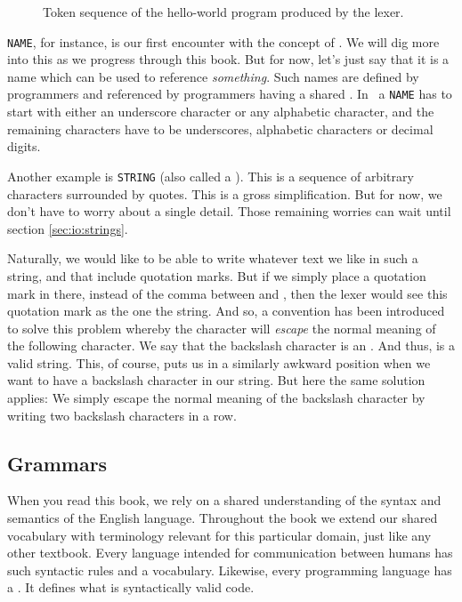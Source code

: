 \begin{figure}[tbp]
  
  \caption{Token sequence of the hello-world program produced by the lexer.}
  \label{fig:first:hello:tokens}
\end{figure}

\texttt{NAME}, for instance, is our first encounter with the concept of . We will dig more into this as we progress through this book. But for now, let's just say that it is a name which can be used to reference \textsl{something}. Such names are defined by programmers and referenced by programmers having a shared . In \csharp\ a \texttt{NAME} has to start with either an underscore character or any alphabetic character, and the remaining characters have to be underscores, alphabetic characters or decimal digits.

Another example is \texttt{STRING} (also called a ). This is a sequence of arbitrary characters surrounded by quotes. This is a gross simplification. But for now, we don't have to worry about a single detail. Those remaining worries can wait until section \ref{sec:io:strings}.

Naturally, we would like to be able to write whatever text we like in such a string, and that include quotation marks. But if we simply place a quotation mark in there, instead of the comma between  and , then the lexer would see this quotation mark as the one  the string. And so, a convention has been introduced to solve this problem whereby the  character will \textsl{escape} the normal meaning of the following character. We say that the backslash character is an . And thus,  is a valid string. This, of course, puts us in a similarly awkward position when we want to have a backslash character in our string. But here the same solution applies: We simply escape the normal meaning of the backslash character by writing two backslash characters in a row.

\subsection{Grammars}

When you read this book, we rely on a shared understanding of the syntax and semantics of the English language. Throughout the book we extend our shared vocabulary with terminology relevant for this particular domain, just like any other textbook. Every language intended for communication between humans has such syntactic rules and a vocabulary. Likewise, every programming language has a . It defines what is syntactically valid code.

